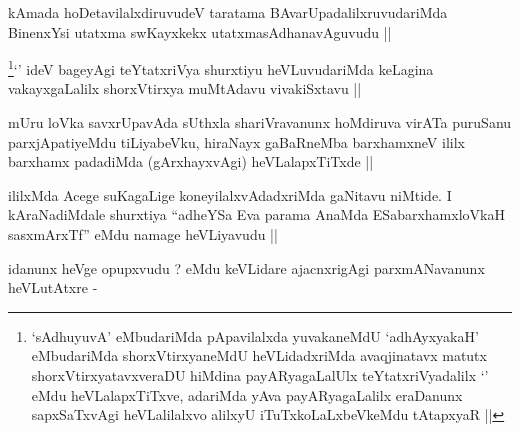 \begin{artha}
kAmada hoDetavilalxdiruvudeV taratama BAvarUpadalilxruvudariMda
BinenxYsi utatxma swKayxkekx utatxmasAdhanavAguvudu ||
\end{artha}

\begin{artha}
\footnote[1]{`sAdhuyuvA' eMbudariMda pApavilalxda yuvakaneMdU
  `adhAyxyakaH' eMbudariMda shorxVtirxyaneMdU heVLidadxriMda
  avaqjinatavx matutx shorxVtirxyatavxveraDU hiMdina payARyagaLalUlx
  teYtatxriVyadalilx `\stext' eMdu heVLalapxTiTxve, adariMda yAva
  payARyagaLalilx eraDanunx sapxSaTxvAgi heVLalilalxvo alilxyU
  iTuTxkoLaLxbeVkeMdu tAtapxyaR ||}`\stext' ideV bageyAgi teYtatxriVya shurxtiyu
heVLuvudariMda keLagina vakayxgaLalilx shorxVtirxya muMtAdavu
vivakiSxtavu ||
\end{artha}


\begin{artha}
mUru loVka savxrUpavAda sUthxla shariVravanunx hoMdiruva virATa
puruSanu parxjApatiyeMdu tiLiyabeVku, hiraNayx gaBaRneMba barxhamxneV
ililx barxhamx padadiMda (gArxhayxvAgi) heVLalapxTiTxde ||
\end{artha}


\begin{artha}
ililxMda Acege suKagaLige koneyilalxvAdadxriMda gaNitavu niMtide. I
kAraNadiMdale shurxtiya ``adheYSa Eva parama AnaMda ESabarxhamxloVkaH
sasxmArxTf'' eMdu namage heVLiyavudu ||
\end{artha}

\begin{artha}
idanunx heVge opupxvudu ? eMdu keVLidare ajacnxrigAgi parxmANavanunx heVLutAtxre -
\end{artha}

